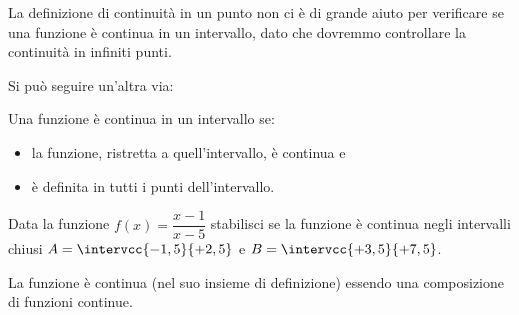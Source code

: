 
La definizione di continuità in un punto non ci è di grande aiuto per 
verificare se una funzione è continua in un intervallo, dato che dovremmo 
controllare la continuità in infiniti punti.

Si può seguire un'altra via: 

\begin{definizione}
Una funzione è continua in un intervallo se:
\begin{itemize} [noitemsep]
\item 
la funzione, ristretta a quell'intervallo, è continua e
\item 
è definita in tutti i punti dell'intervallo.
\end{itemize}
\end{definizione}

\begin{esempio}
Data la funzione \(f(x) = \dfrac{x-1}{x-5}\) stabilisci se la funzione è 
continua negli intervalli chiusi \(A=\intervcc{-1,5}{+2,5}\) e 
\(B=\intervcc{+3,5}{+7,5}\).

La funzione è continua (nel suo insieme di definizione) essendo una 
composizione di funzioni continue.

\end{esempio}

